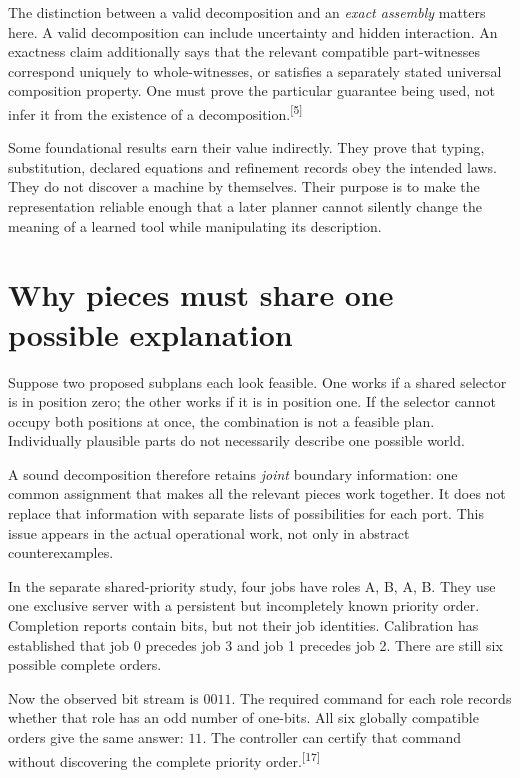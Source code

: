 \documentclass[11pt]{article}
\newcommand{\sn}[1]{\textsuperscript{[#1]}}
\begin{document}
The distinction between a valid decomposition and an \emph{exact assembly} matters here. A valid decomposition can include uncertainty and hidden interaction. An exactness claim additionally says that the relevant compatible part-witnesses correspond uniquely to whole-witnesses, or satisfies a separately stated universal composition property. One must prove the particular guarantee being used, not infer it from the existence of a decomposition.\sn{5}

Some foundational results earn their value indirectly. They prove that typing, substitution, declared equations and refinement records obey the intended laws. They do not discover a machine by themselves. Their purpose is to make the representation reliable enough that a later planner cannot silently change the meaning of a learned tool while manipulating its description.

\section{Why pieces must share one possible explanation}

Suppose two proposed subplans each look feasible. One works if a shared selector is in position zero; the other works if it is in position one. If the selector cannot occupy both positions at once, the combination is not a feasible plan. Individually plausible parts do not necessarily describe one possible world.

A sound decomposition therefore retains \emph{joint} boundary information: one common assignment that makes all the relevant pieces work together. It does not replace that information with separate lists of possibilities for each port. This issue appears in the actual operational work, not only in abstract counterexamples.

In the separate shared-priority study, four jobs have roles A, B, A, B. They use one exclusive server with a persistent but incompletely known priority order. Completion reports contain bits, but not their job identities. Calibration has established that job 0 precedes job 3 and job 1 precedes job 2. There are still six possible complete orders.

Now the observed bit stream is $0011$. The required command for each role records whether that role has an odd number of one-bits. All six globally compatible orders give the same answer: $11$. The controller can certify that command without discovering the complete priority order.\sn{17}
\end{document}
